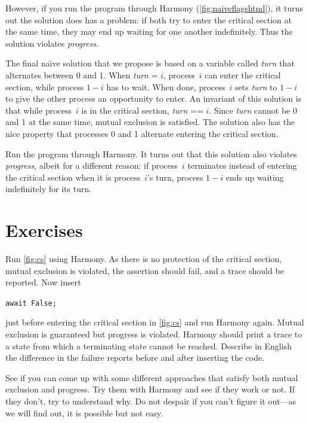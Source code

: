 \documentclass{report}
\newenvironment{code}{
\tcolorbox
}{
\endtcolorbox
}
\begin{document}
However, if you run the program through Harmony (\autoref{fig:naiveflagshtml}),
it turns out the solution
does has a problem: if both try to enter the critical section at the same
time, they may end up waiting for one another indefinitely.  Thus the
solution violates \emph{progress}.

The final na\"{\i}ve solution that we propose
is based on a variable called \textit{turn}
that alternates between 0 and 1.  When \textit{turn} = $i$, process~$i$ can
enter the critical section, while process $1-i$ has to wait.  When done,
process~$i$ sets \textit{turn} to $1-i$ to give the other process an
opportunity to enter.
An invariant of this solution is that while process~$i$ is in the critical
section, \textit{turn} == $i$.
Since \textit{turn} cannot be 0 and 1 at
the same time, mutual exclusion is satisfied.
The solution also has the nice property that
processes 0 and 1 alternate entering the critical section.

Run the program through Harmony.  It turns out that this solution also violates
\emph{progress}, albeit for a different reason:
if process~$i$ terminates instead of entering the critical section when it
is process~$i$'s turn, process $1-i$ ends up waiting indefinitely for its
turn.

\section*{Exercises}
\begin{problems}
\item Run \autoref{fig:cs} using Harmony.  As there is no protection of the critical
section, mutual exclusion is violated,
the assertion should fail, and a trace should be reported.
Now insert
\begin{code}
\texttt{await False;}
\end{code}
just before entering the critical section
in \autoref{fig:cs} and run Harmony again.
Mutual exclusion is guaranteed but progress is violated.
Harmony should print a trace
to a state from which a terminating state cannot be reached.
Describe in English the difference in the failure reports before
and after inserting the code.
\item See if you can come up with some different approaches that satisfy both
mutual exclusion and progress.  Try them with Harmony and see if they work or not.
If they don't, try to understand why.
Do not despair if you can't figure it out---as
we will find out, it is possible but not easy.
\end{problems}
\end{document}
